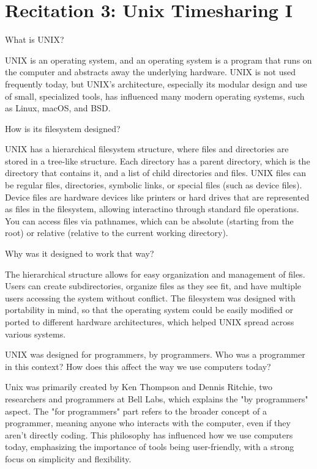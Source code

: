 \documentclass[a4paper]{article}
\begin{document}
\section*{Recitation 3: Unix Timesharing I}

\begin{Exercise}
    What is UNIX?
\end{Exercise} 
\begin{Solution}
    UNIX is an operating system, and an operating system is a program that runs on the computer and abstracts away the underlying hardware. UNIX is not used frequently today, but UNIX's architecture, especially its modular design and use of small, specialized tools, has influenced many modern operating systems, such as Linux, macOS, and BSD.
\end{Solution}

\begin{Exercise}
    How is its filesystem designed?
\end{Exercise}
\begin{Solution}
    UNIX has a hierarchical filesystem structure, where files and directories are stored in a tree-like structure. Each directory has a parent directory, which is the directory that contains it, and a list of child directories and files. UNIX files can be regular files, directories, symbolic links, or special files (such as device files). Device files are hardware devices like printers or hard drives that are represented as files in the filesystem, allowing interactino through standard file operations. You can access files via pathnames, which can be absolute (starting from the root) or relative (relative to the current working directory).
\end{Solution}
\begin{Exercise}
    Why was it designed to work that way?
\end{Exercise}
\begin{Solution}
    The hierarchical structure allows for easy organization and management of files. Users can create subdirectories, organize files as they see fit, and have multiple users accessing the system without conflict. The filesystem was designed with portability in mind, so that the operating system could be easily modified or ported to different hardware architectures, which helped UNIX spread across various systems.
\end{Solution}
\begin{Exercise}
    UNIX was designed for programmers, by programmers. Who was a programmer in this context? How does this affect the way we use computers today?
\end{Exercise}
\begin{Solution}
    Unix was primarily created by Ken Thompson and Dennis Ritchie, two researchers and programmers at Bell Labs, which explains the "by programmers" aspect. The "for programmers" part refers to the broader concept of a programmer, meaning anyone who interacts with the computer, even if they aren't directly coding. This philosophy has influenced how we use computers today, emphasizing the importance of tools being user-friendly, with a strong focus on simplicity and flexibility.
\end{Solution}
\end{document}
